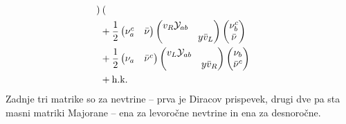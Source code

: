 \begin{align}
\begin{pmatrix}
	\end{pmatrix} \notag \\
	&+ \frac{1}{2} \begin{pmatrix}
		\nu^c_a &\bar{\nu}
	\end{pmatrix} \begin{pmatrix}
		v_R \mathcal{Y}_{ab} & \\
		& y \bar{v}_L
	\end{pmatrix} \begin{pmatrix}
		\nu^c_b \\ \bar{\nu}
	\end{pmatrix} \notag \\
	&+ \frac{1}{2}\begin{pmatrix}
		\nu_a & \bar{\nu}^c
	\end{pmatrix} \begin{pmatrix}
		v_L \mathcal{Y}_{ab} & \\
		& y \bar{v}_R
	\end{pmatrix} \begin{pmatrix}
		\nu_b \\ \bar{\nu}^c
	\end{pmatrix} \notag \\
	&+ \text{h.k.}
\end{align}
Zadnje tri matrike so za nevtrine -- prva je Diracov prispevek, drugi dve pa sta masni matriki
Majorane -- ena za levoročne nevtrine in ena za desnoročne.

